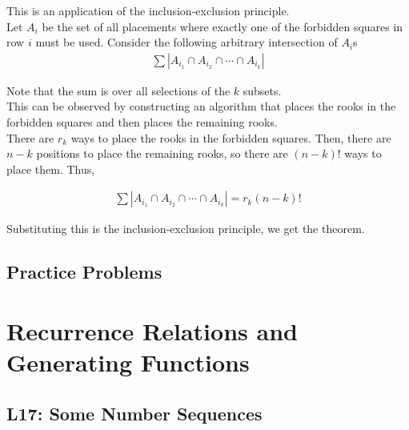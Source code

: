 \documentclass{report}
\begin{document}
\begin{subproof}
    This is an application of the inclusion-exclusion principle. \\

    Let $A_i$ be the set of all placements where exactly one of the
    forbidden squares in row $i$ must be used. Consider the following
    arbitrary intersection of $A_i$s \\

    \begin{align*}
        \sum |A_{i_1} \cap A_{i_2} \cap \cdots \cap A_{i_k}|
    \end{align*}

    Note that the sum is over all selections of the $k$ subsets. \\

    This can be observed by constructing an algorithm that places the rooks
    in the forbidden squares and then places the remaining rooks. \\

    There are $r_k$ ways to place the rooks in the forbidden squares. Then,
    there are $n - k$ positions to place the remaining rooks, so there are
    $(n-k)!$ ways to place them. Thus,

    \begin{align*}
        \sum |A_{i_1} \cap A_{i_2} \cap \cdots \cap A_{i_k}| = r_k(n-k)!
    \end{align*}

    Substituting this is the inclusion-exclusion principle, we get
    the theorem.

\end{subproof}

\section{Practice Problems}

\chapter{Recurrence Relations and Generating Functions}
\section{L17: Some Number Sequences}

\end{document}
